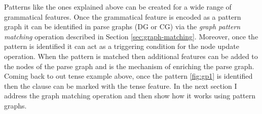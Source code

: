     

    Patterns like the ones explained above can be created for a wide range of grammatical features. Once the grammatical feature is encoded as a pattern graph it can be identified in parse graphs (DG or CG) via the \textit{graph pattern matching} operation described in Section \ref{sec:graph-matching}. Moreover, once the pattern is identified it can act as a triggering condition for the node update operation. When the pattern is matched then additional features can be added to the nodes of the parse graph and is the mechanism of enriching the parse graph. Coming back to out tense example above, once the pattern \ref{fig:gp1} is identified then the clause can be marked with the tense feature. In the next section I address the graph matching operation and then show how it works using pattern graphs. 



